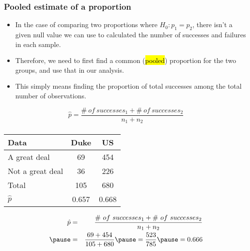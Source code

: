 \documentclass[slidestop,compress,mathserif]{beamer}
\newcommand{\soln}[1]{\textit{#1}}
\begin{document}

\begin{frame}
\frametitle{Pooled estimate of a proportion}

\begin{itemize}

\item In the case of comparing two proportions where $H_0: p_1 = p_2$, there isn't a given null value we can use to calculated the  number of successes and failures in each sample.

\pause

\item Therefore, we need to first find a common (\hl{pooled}) proportion for the two groups, and use that in our analysis.

\pause

\item This simply means finding the proportion of total successes among the total number of observations.

\end{itemize}

$\:$ \\

{ \[ \hat{p} = \frac{\#~of~successes_1 + \#~of~successes_2}{n_1 + n_2} \] }

\end{frame}


\begin{frame}
\frametitle{}


{\footnotesize
\begin{center}
\begin{tabular}{l | c c}
Data			& Duke		& US \\
\hline
A great deal	& 69			& 454 \\
Not a great deal& 36			& 226 \\
\hline
Total			& 105		& 680 \\
\hline
$\hat{p}$		& 0.657		& 0.668
\end{tabular}
\end{center}
}

\pause

\soln{
\begin{eqnarray*}
\hat{p} &=& \frac{\#~of~successes_1 + \#~of~successes_2}{n_1 + n_2} \\
\pause
&=& \frac{69+454}{105+680} \pause = \frac{523}{785} \pause = 0.666
\end{eqnarray*}
}

\end{frame}
\end{document}
